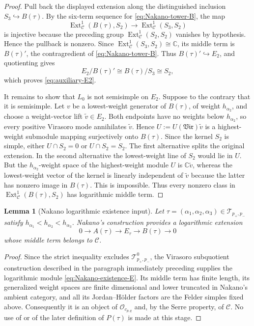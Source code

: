 \documentclass[12pt,leqno]{amsart}
\numberwithin{equation}{section}
\newtheorem{lem}[thm]{Lemma}
\newcommand{\Ext}{\operatorname{Ext}}
\newcommand{\Vir}{\mathfrak{Vir}}
\newcommand{\Oc}{\mathcal O}
\def\C{\mathbb{C}}
\begin{document}
\begin{proof}
Pull back the displayed extension along the distinguished inclusion
$S_3\hookrightarrow B(\tau)$.  By the six-term sequence for
\eqref{eq:Nakano-tower-B}, the map
\[
 \Ext^1_{\mathscr C}(B(\tau),S_2)
 \longrightarrow
 \Ext^1_{\mathscr C}(S_3,S_2)
\]
is injective because the preceding group
$\Ext^1_{\mathscr C}(S_2,S_2)$ vanishes by hypothesis.  Hence the
pullback is nonzero.
Since $\Ext^1_{\mathscr C}(S_3,S_2)\cong\C$, its middle term is
$B(\tau)'$, the contragredient of \eqref{eq:Nakano-tower-B}.  Thus
$B(\tau)'\hookrightarrow E_2$, and quotienting gives
\[
 E_2/B(\tau)'\cong B(\tau)/S_3\cong S_2,
\]
which proves \eqref{eq:auxiliary-E2}.

It remains to show that $L_0$ is not semisimple on $E_2$.  Suppose to the
contrary that it is semisimple.  Let $v$ be a lowest-weight generator of
$B(\tau)$, of weight $h_{\alpha_2}$, and choose a weight-vector lift
$\widetilde v\in E_2$.  Both endpoints have no weights below
$h_{\alpha_2}$, so every positive Virasoro mode annihilates
$\widetilde v$.  Hence $U:=U(\Vir)\widetilde v$ is a highest-weight
submodule mapping surjectively onto $B(\tau)$.  Since the kernel $S_2$ is
simple, either $U\cap S_2=0$ or $U\cap S_2=S_2$.  The first alternative
splits the original extension.  In the second alternative the
lowest-weight line of $S_2$ would lie in $U$.  But the
$h_{\alpha_2}$-weight space of the highest-weight module $U$ is
$\C\widetilde v$, whereas the lowest-weight vector of the kernel is
linearly independent of $\widetilde v$ because the latter has nonzero
image in $B(\tau)$.  This is impossible.  Thus every nonzero class in
$\Ext^1_{\mathscr C}(B(\tau),S_2)$ has logarithmic middle term.
\end{proof}

\begin{lem}[Nakano logarithmic existence input]
\label{lem:Nakano-existence-input}
Let $\tau=(\alpha_1,\alpha_2,\alpha_3)\in\mathcal T_{p_+,p_-}$ satisfy
$h_{\alpha_1}<h_{\alpha_2}<h_{\alpha_3}$.  Nakano's construction
provides a logarithmic extension
\begin{equation}\label{eq:Nakano-existence-E}
 0\longrightarrow A(\tau)\longrightarrow E_\tau\longrightarrow
 B(\tau)\longrightarrow0
\end{equation}
whose middle term belongs to $\mathscr C$.
\end{lem}

\begin{proof}
Since the strict inequality excludes $\mathcal T^0_{p_+,p_-}$, the
Virasoro subquotient construction described in the paragraph immediately
preceding \cite[Theorem~5.11]{Nakano} supplies the logarithmic module
\eqref{eq:Nakano-existence-E}.  Its middle term has finite length, its
generalized weight spaces are finite dimensional and lower truncated in
Nakano's ambient category, and all its Jordan--H\"older factors are the
Felder simples fixed above.  Consequently it is an object of
$\Oc_{c_{p,q}}$ and, by the Serre property, of $\mathscr C$.  No use of
\cite[Proposition~5.12]{Nakano} or of the later definition of $P(\tau)$
is made at this stage.
\end{proof}
\end{document}
